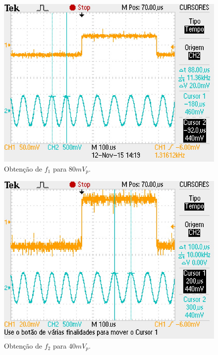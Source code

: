 \documentclass[12pt,a4paper]{article}%
\begin{document}
\begin{figure}[H]
\centering
\includegraphics[scale=0.5]{imagem/TEK0006}
\caption{Obtenção de $f_1$ para $80 mV_p$.}
\label{fig:06}
\end{figure}

\begin{figure}[H]
\centering
\includegraphics[scale=0.5]{imagem/TEK0007}
\caption{Obtenção de $f_2$ para $40 mV_p$.}
\label{fig:07}
\end{figure}
\end{document}
